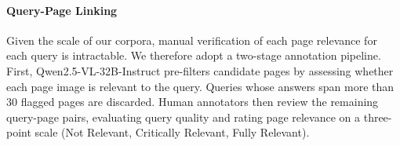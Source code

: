 


\paragraph{Query-Page Linking} Given the scale of our corpora, manual verification of each page relevance for each query is intractable. We therefore adopt a two-stage annotation pipeline. First, Qwen2.5-VL-32B-Instruct  pre-filters candidate pages by assessing whether each page image is relevant to the query. Queries whose answers span more than 30 flagged pages are discarded. Human annotators then review the remaining query-page pairs, evaluating query quality and rating page relevance on a three-point scale (Not Relevant, Critically Relevant, Fully Relevant).



